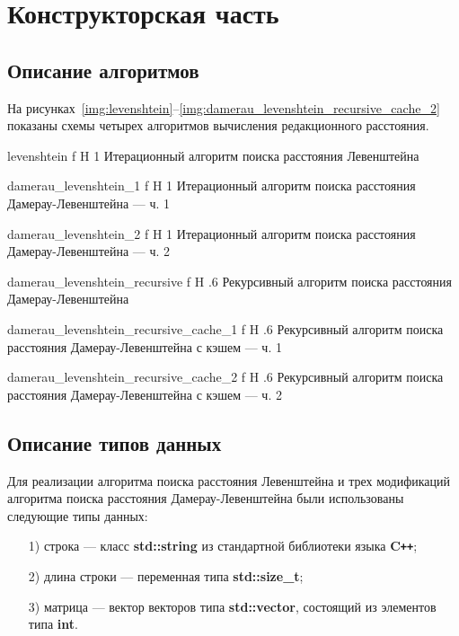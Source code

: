 \chapter{Конструкторская часть}

\section{Описание алгоритмов}

На рисунках~\ref{img:levenshtein}--\ref{img:damerau_levenshtein_recursive_cache_2} показаны схемы четырех алгоритмов вычисления редакционного расстояния.

    {levenshtein}
    {f}
    {H}
    {1\textwidth}
    {Итерационный алгоритм поиска расстояния Левенштейна}
    
    {damerau_levenshtein_1}
    {f}
    {H}
    {1\textwidth}
    {Итерационный алгоритм поиска расстояния Дамерау-Левенштейна --- ч. 1}
    
    {damerau_levenshtein_2}
    {f}
    {H}
    {1\textwidth}
    {Итерационный алгоритм поиска расстояния Дамерау-Левенштейна --- ч. 2}
    
    {damerau_levenshtein_recursive}
    {f}
    {H}
    {.6\textwidth}
    {Рекурсивный алгоритм поиска расстояния Дамерау-Левенштейна}
    
    {damerau_levenshtein_recursive_cache_1}
    {f}
    {H}
    {.6\textwidth}
    {Рекурсивный алгоритм поиска расстояния Дамерау-Левенштейна с кэшем --- ч. 1}
    
    {damerau_levenshtein_recursive_cache_2}
    {f}
    {H}
    {.6\textwidth}
    {Рекурсивный алгоритм поиска расстояния Дамерау-Левенштейна с кэшем --- ч. 2}

\section{Описание типов данных}

Для реализации алгоритма поиска расстояния Левенштейна и трех модификаций алгоритма поиска расстояния Дамерау-Левенштейна были использованы следующие типы данных:
\begin{enumerate}
\item[1)] строка --- класс \textbf{std::string} из стандартной библиотеки языка \textbf{C\texttt{++}};
\item[2)] длина строки --- переменная типа \textbf{std::size\_t};
\item[3)] матрица --- вектор векторов типа \textbf{std::vector}, состоящий из элементов типа \textbf{int}.
\end{enumerate}

